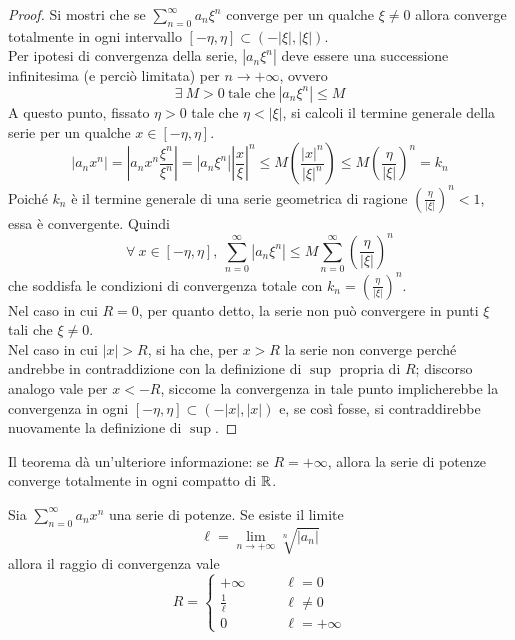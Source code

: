 \begin{proof}
 Si mostri che se $\sum\limits_{n=0}^{\infty}{a_n \xi^n}$ converge per un qualche $\xi \neq 0$ allora converge totalmente in ogni intervallo $[-\eta, \eta] \subset (-|\xi|, |\xi|)$.\\
 Per ipotesi di convergenza della serie, $|a_n \xi^n|$ deve essere una successione infinitesima (e perciò limitata) per $n\to +\infty$, ovvero
 \begin{equation}
     \exists\ M>0\ \text{tale che}\ |a_n\xi^n|\leq M
 \end{equation}
 A questo punto, fissato $\eta>0$ tale che $\eta<|\xi|$, si calcoli il termine generale della serie per un qualche $x \in [-\eta, \eta]$.
 \begin{equation}
     |a_n x^n| = \left|a_n x^n \frac{\xi^n}{\xi^n}\right|=\left|a_n \xi^n\right| \left|\frac{x}{\xi}\right|^n \leq M \left(\frac{|x|^n}{\left|\xi\right|^n} \right)\leq M \left(\frac{\eta}{\left| \xi \right|} \right)^n =k_n
 \end{equation}
 Poiché $k_n$ è il termine generale di una serie geometrica di ragione $\left(\tfrac{\eta}{\left| \xi \right|} \right)^n < 1$, essa è convergente. Quindi
 \begin{equation}
 \forall\ x \in [-\eta, \eta],\ \sum\limits_{n=0}^{\infty}{|a_n \xi^n|} \leq M \sum_{n=0}^{\infty}{\left(\frac{\eta}{\left| \xi \right|} \right)^n}
 \end{equation}
 che soddisfa le condizioni di convergenza totale con $k_n=\left(\tfrac{\eta}{\left| \xi \right|} \right)^n$.\\
 Nel caso in cui $R=0$, per quanto detto, la serie non può convergere in punti $\xi$ tali che $\xi \neq 0$.\\
 Nel caso in cui $|x|>R$, si ha che, per $x>R$ la serie non converge perché andrebbe in contraddizione con la definizione di $\sup$ propria di $R$; discorso analogo vale per $x<-R$, siccome la convergenza in tale punto implicherebbe la convergenza in ogni $[-\eta, \eta] \subset (-|x|, |x|)$ e, se così fosse, si contraddirebbe nuovamente la definizione di $\sup$.
\end{proof}
\begin{oss}
Il teorema dà un'ulteriore informazione: se $R= +\infty$, allora la serie di potenze converge totalmente in ogni compatto di $\mathbb{R}$.
\end{oss}
\begin{theorem} \label{Teo: Criterio di Cauchy-Hadamard}
Sia $\sum\limits_{n=0}^{\infty}{a_n x^n}$ una serie di potenze. Se esiste il limite
\begin{equation}
    \ell=\lim_{n \to +\infty}{\sqrt[n]{|a_n|}}
\end{equation}
    allora il raggio di convergenza vale
    \begin{equation}
        R = \begin{cases}
            +\infty &\qquad \ell=0\\
            \frac{1}{\ell} &\qquad \ell \neq 0\\
            0 &\qquad \ell = +\infty
        \end{cases}
    \end{equation}
\end{theorem}
